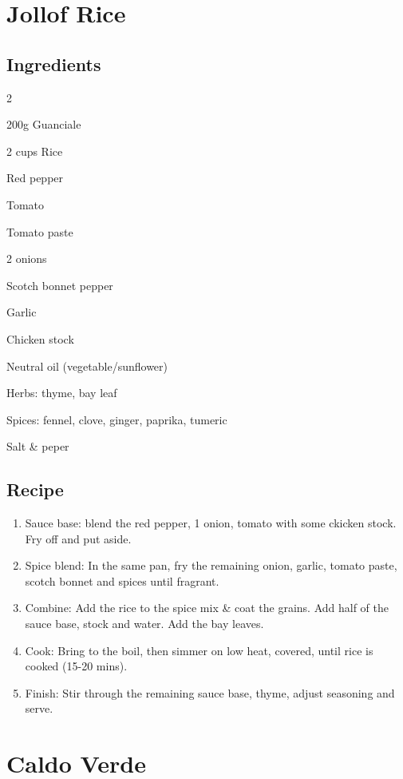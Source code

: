 \section{Jollof Rice}
\subsection*{Ingredients}
\begin{multicols}{2}
\begin{ingredients}
    \item 200g Guanciale
    \item 2 cups Rice
    \item Red pepper
    \item Tomato
    \item Tomato paste
    \item 2 onions
    \item Scotch bonnet pepper
    \item Garlic
    \item Chicken stock
    \item Neutral oil (vegetable/sunflower)
    \item Herbs: thyme, bay leaf
    \item Spices: fennel, clove, ginger, paprika, tumeric
    \item Salt \& peper
\end{ingredients}
\end{multicols}
\subsection*{Recipe}
\begin{enumerate}
    \item Sauce base: blend the red pepper, 1 onion, tomato with some ckicken stock. Fry off and put aside.
    \item Spice blend: In the same pan, fry the remaining onion, garlic, tomato paste, scotch bonnet and spices until fragrant.
    \item Combine: Add the rice to the spice mix \& coat the grains. Add half of the sauce base, stock and water. Add the bay leaves.
    \item Cook: Bring to the boil, then simmer on low heat, covered, until rice is cooked (15-20 mins).
    \item Finish: Stir through the remaining sauce base, thyme, adjust seasoning and serve.
\end{enumerate}

\newpage
\section{Caldo Verde}
